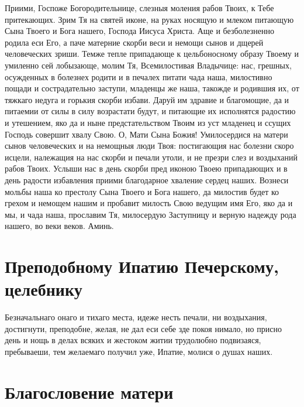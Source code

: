 Приими, Госпоже Богородительнице, слезныя моления рабов Твоих, к Тебе притекающих. Зрим Тя на святей иконе, на руках носящую и млеком питающую Сына Твоего и Бога нашего, Господа Иисуса Христа. Аще и безболезненно родила еси Его, а паче матерние скорби веси и немощи сынов и дщерей человеческих зриши. Темже тепле припадающе к цельбоносному образу Твоему и умиленно сей лобызающе, молим Тя, Всемилостивая Владычице: нас, грешных, осужденных в болезнех родити и в печалех питати чада наша, милостивно пощади и сострадательно заступи, младенцы же наша, такожде и родившия их, от тяжкаго недуга и горькия скорби избави. Даруй им здравие и благомощие, да и питаемии от силы в силу возрастати будут, и питающие их исполнятся радостию и утешением, яко да и ныне предстательством Твоим из уст младенец и ссущих Господь совершит хвалу Свою. О, Мати Сына Божия! Умилосердися на матери сынов человеческих и на немощныя люди Твоя: постигающия нас болезни скоро исцели, належащия на нас скорби и печали утоли, и не презри слез и воздыханий рабов Твоих. Услыши нас в день скорби пред иконою Твоею припадающих и в день радости избавления приими благодарное хваление сердец наших. Вознеси мольбы наша ко престолу Сына Твоего и Бога нашего, да милостив будет ко грехом и немощем нашим и пробавит милость Свою ведущим имя Его, яко да и мы, и чада наша, прославим Тя, милосердую Заступницу и верную надежду рода нашего, во веки веков. Аминь.

\section{Преподобному Ипатию Печерскому, целебнику}
 


Безначальнаго онаго и тихаго места, идеже несть печали, ни воздыхания, достигнути, преподобне, желая, не дал еси себе зде покоя нимало, но присно день и нощь в делах всяких и жестоком житии трудолюбно подвизаяся, пребываеши, тем желаемаго получил уже, Ипатие, молися о душах наших.\mychapterending


 

\section{Благословение матери}
 


